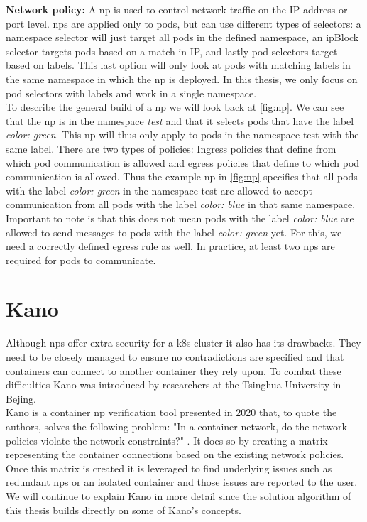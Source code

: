 \textbf{Network policy:} \label{comp:networkpolicy} A \acrfull{np} is used to control network traffic on the IP address or port level. \acrshort{np}s are applied only to pods, but can use different types of selectors: a namespace selector will just target all pods in the defined namespace, an ipBlock selector targets pods based on a match in IP, and lastly pod selectors target based on labels. This last option will only look at pods with matching labels in the same namespace in which the \acrshort{np} is deployed. In this thesis, we only focus on pod selectors with labels and work in a single namespace.
\\[10pt]
To describe the general build of a \acrshort{np} we will look back at \autoref{fig:np}. We can see that the \acrshort{np} is in the namespace \textit{test} and that it selects pods that have the label \textit{color: green}. This \acrshort{np} will thus only apply to pods in the namespace test with the same label. There are two types of policies: Ingress policies that define from which pod communication is allowed and egress policies that define to which pod communication is allowed. Thus the example \acrshort{np} in \autoref{fig:np} specifies that all pods with the label \textit{color: green} in the namespace test are allowed to accept communication from all pods with the label \textit{color: blue} in that same namespace.
\\[10pt]


Important to note is that this does not mean pods with the label \textit{color: blue} are allowed to send messages to pods with the label \textit{color: green} yet. For this, we need a correctly defined egress rule as well. In practice, at least two \acrshort{np}s are required for pods to communicate. \cite{k8snp}



\section{Kano}\label{sec:kano}
Although \acrshort{np}s offer extra security for a \acrshort{k8s} cluster it also has its drawbacks. They need to be closely managed to ensure no contradictions are specified and that containers can connect to another container they rely upon. To combat these difficulties Kano was introduced by researchers at the Tsinghua University in Bejing.
\\[10pt]
Kano is a container \acrshort{np} verification tool presented in 2020 that, to quote the authors, solves the following problem: "In a container network, do the network
policies violate the network constraints?" \cite{kano}. It does so by creating a matrix representing the container connections based on the existing network policies. Once this matrix is created it is leveraged to find underlying issues such as redundant \acrshort{np}s or an isolated container and those issues are reported to the user. We will continue to explain Kano in more detail since the solution algorithm of this thesis builds directly on some of Kano's concepts.
\\[10pt]

